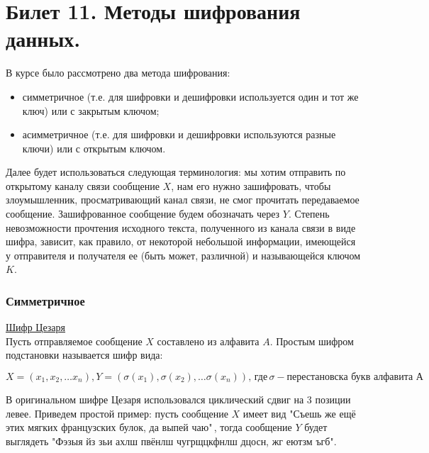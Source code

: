 \newpage
\section {Билет 11. Методы шифрования данных.}
В курсе было рассмотрено два метода шифрования:
\begin {itemize}
\item симметричное (т.е. для шифровки и дешифровки используется один и тот же ключ) или с закрытым ключом;
\item асимметричное (т.е. для шифровки и дешифровки используются разные ключи) или с открытым ключом.
\end {itemize}

Далее будет использоваться следующая терминология: мы хотим отправить по открытому каналу связи сообщение $X$, нам его нужно зашифровать, чтобы злоумышленник, просматривающий канал связи, не смог прочитать передаваемое сообщение. Зашифрованное сообщение будем обозначать через $Y$. Степень невозможности прочтения исходного текста, полученного из канала связи в виде шифра, зависит, как правило, от некоторой небольшой информации, имеющейся у отправителя и получателя ее (быть может, различной) и называющейся ключом $K$.

\subsubsection{Симметричное}
\href{https://clck.ru/9KE6e}{Шифр Цезаря} \\
Пусть отправляемое сообщение $X$ составлено из алфавита $A$. Простым шифром подстановки называется шифр вида:

$$ X = (x_1, x_2, \dots x_n), Y = (\sigma (x_1), \sigma(x_2), \dots \sigma(x_n)), \, \text{где}\, \sigma - \text {перестановска букв алфавита А} $$

В оригинальном шифре Цезаря использовался циклический сдвиг на 3 позиции левее. Приведем простой пример: пусть сообщение $X$ имеет вид "Съешь же ещё этих мягких французских булок, да выпей чаю"\,, тогда сообщение $Y$ будет выглядеть "Фэзыя йз зьи ахлш пвёнлш чугрщцкфнлш дцосн, жг еютзм ъгб". \\

